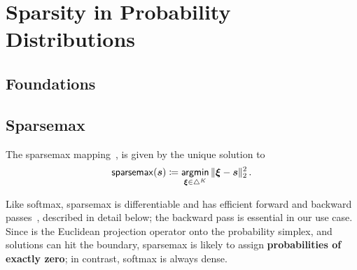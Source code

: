 \section{Sparsity in Probability Distributions}
\label{sec:sparsity_background}

\subsection{Foundations}

\subsection{Sparsemax}\label{sec:sparsemax_bg}

The sparsemax mapping~\citep{martins2016softmax}, is given by the unique solution to
\begin{equation}\label{eq:sparsemax}
    \operatorname*{\mathsf{sparsemax}}(\bm{s}) \coloneqq \operatorname*{\mathsf{argmin}}_{\bm{\xi} \in \triangle^K} \| \bm{\xi} - \bm{s} \|_2^2\,.
\end{equation}

Like softmax, sparsemax is differentiable and has efficient forward and backward
passes~\citep{Held1974,martins2016softmax}, described in detail below;
the backward pass is essential in our use case. Since
 is the Euclidean projection operator onto the probability
simplex, and solutions can hit the boundary, sparsemax is likely to assign {\bf
        probabilities of exactly zero}; in contrast, softmax is always dense.

